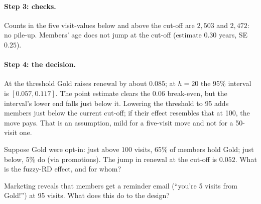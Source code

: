 \documentclass[11pt]{article}
\begin{document}
\paragraph{Step 3: checks.} Counts in the five visit-values below and above the cut-off are $2{,}503$ and $2{,}472$: no pile-up. Members' age does not
jump at the cut-off (estimate $0.30$ years, SE $0.25$).

\paragraph{Step 4: the decision.} At the threshold Gold raises renewal by about $0.085$; at $h = 20$ the 95\% interval is $[0.057, 0.117]$. The
point estimate clears the $0.06$ break-even, but the interval's lower end falls just below it. Lowering the threshold to 95 adds members just below the current cut-off; if their effect resembles that at 100, the move pays.
That is an assumption, mild for a five-visit move and not for a 50-visit one.

\begin{exercise}[computation]
Suppose Gold were opt-in: just above 100 visits, 65\% of members hold Gold; just below, 5\% do (via promotions). The jump in renewal at the cut-off is
$0.052$. What is the fuzzy-RD effect, and for whom?
\end{exercise}

\begin{exercise}[judgment]
Marketing reveals that members get a reminder email (``you're 5 visits from Gold!'') at 95 visits. What does this do to the design?
\end{exercise}

\sectionthree
\end{document}

